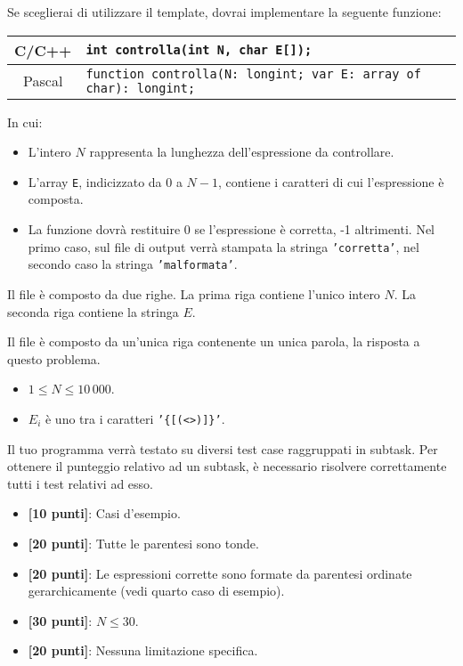 Se sceglierai di utilizzare il template, dovrai implementare la seguente funzione:
\begin{center}\begin{tabularx}{\textwidth}{|c|X|}
\hline
C/C++  & \verb|int controlla(int N, char E[]);|\\
\hline
Pascal & \verb|function controlla(N: longint; var E: array of char): longint;|\\
\hline
\end{tabularx}\end{center}
In cui:
\begin{itemize}[nolistsep]
  \item L'intero $N$ rappresenta la lunghezza dell'espressione da controllare.
  \item L'array \texttt{E}, indicizzato da $0$ a $N-1$, contiene i caratteri di cui l'espressione è composta.
  \item La funzione dovrà restituire 0 se l'espressione è corretta, -1 altrimenti. Nel primo caso, sul file di output verrà stampata la stringa \texttt{'corretta'}, nel secondo caso la stringa \texttt{'malformata'}.
\end{itemize}

\InputFile
Il file  è composto da due righe. La prima riga contiene l'unico intero $N$. La seconda riga contiene la stringa $E$.

\OutputFile
Il file \outputfile{} è composto da un'unica riga contenente un unica parola, la risposta a questo problema.

\pagebreak
\Constraints
\begin{itemize}[nolistsep, itemsep=2mm]
	\item $1 \le N \le 10\,000$.
	\item $E_i$ è uno tra i caratteri \texttt{'\{[(<>)]\}'}.
\end{itemize}

\Scoring
Il tuo programma verrà testato su diversi test case raggruppati in subtask.
Per ottenere il punteggio relativo ad un subtask, è necessario risolvere
correttamente tutti i test relativi ad esso.

\begin{itemize}[nolistsep,itemsep=2mm]
  \item \textbf{ [10 punti]}: Casi d'esempio.
  \item \textbf{ [20 punti]}: Tutte le parentesi sono tonde.
  \item \textbf{ [20 punti]}: Le espressioni corrette sono formate da parentesi ordinate gerarchicamente (vedi quarto caso di esempio).
  \item \textbf{ [30 punti]}: $N \leq 30$.
  \item \textbf{ [20 punti]}: Nessuna limitazione specifica.
\end{itemize}

